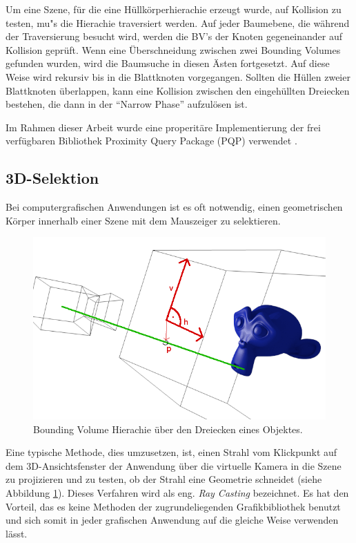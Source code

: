 Um eine Szene, f\"ur die eine H\"ullk\"orperhierachie erzeugt wurde, auf Kollision zu testen, mu"s die Hierachie traversiert werden. Auf jeder Baumebene, die w\"ahrend der Traversierung besucht wird,  werden die BV's der Knoten
gegeneinander auf Kollision gepr\"uft. Wenn eine \"Uberschneidung zwischen zwei Bounding Volumes gefunden wurden, wird
die Baumsuche in diesen \"Asten fortgesetzt. Auf diese Weise wird rekursiv bis in die Blattknoten vorgegangen. Sollten die H\"ullen zweier Blattknoten \"uberlappen, kann eine Kollision zwischen den eingeh\"ullten Dreiecken bestehen, die dann in der "`Narrow Phase"' aufzul\"osen ist.

Im Rahmen dieser Arbeit wurde eine properit\"are Implementierung der frei verf\"ugbaren Bibliothek Proximity Query
Package (PQP) verwendet \cite{PQP}.

\subsection{3D-Selektion}
\label{picking}

Bei computergrafischen Anwendungen ist es oft notwendig, einen geometrischen K\"orper innerhalb einer Szene mit dem Mauszeiger zu selektieren. 

\begin{figure}[H]
\centerline{
	\includegraphics[scale=0.7]{graphics/raypicking.png}
}
\caption{Bounding Volume Hierachie \"uber den Dreiecken eines Objektes.}
\label{rayPicking}
\end{figure}

Eine typische Methode, dies umzusetzen, ist, einen Strahl vom Klickpunkt auf dem 3D-Ansichtsfenster der Anwendung \"uber die virtuelle Kamera in die Szene zu projizieren und zu testen,  ob der Strahl eine Geometrie schneidet (siehe Abbildung \ref{rayPicking}).
Dieses Verfahren wird als eng. \textit{Ray Casting} bezeichnet. Es hat den Vorteil, das es keine Methoden der zugrundeliegenden Grafikbibliothek benutzt und sich somit in jeder grafischen Anwendung auf die gleiche Weise verwenden l\"asst.

